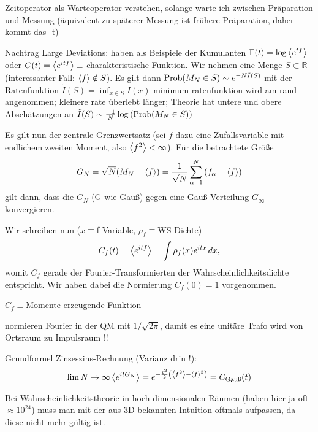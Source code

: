 Zeitoperator als Warteoperator verstehen, solange warte ich zwischen Präparation und Messung (äquivalent zu späterer Messung ist frühere Präparation, daher kommt das -t)



Nachtrag Large Deviations: haben als Beispiele der Kumulanten $\Gamma(t) = \log\expval{e^{tf}}$ oder $C(t) = \expval{e^{itf}} \equiv$ charakteristische Funktion. Wir nehmen eine Menge $S \subset \mathbb{R}$ (interessanter Fall: $\expval{f} \notin S$). Es gilt dann $\text{Prob}\qty(M_N \in S) \sim e^{-N \tilde{I}(S)}$ mit der Ratenfunktion $\tilde{I}(S) = \inf_{x \in S} I(x)$
minimum ratenfunktion wird am rand angenommen; kleinere rate überlebt länger; Theorie hat untere und obere Abschätzungen an $\tilde{I}(S) \sim \frac{-1}{N} \log\qty(\text{Prob}\qty(M_N \in S))$

Es gilt nun der zentrale Grenzwertsatz (sei $f$ dazu eine Zufallsvariable mit endlichem zweiten Moment, also $\expval{f^2} < \infty$). Für die betrachtete Größe
\begin{equation}\label{key}
G_N = \sqrt{N} \qty(M_N - \expval{f}) = \frac{1}{\sqrt{N}} \sum\limits_{\alpha = 1}^N \qty(f_\alpha - \expval{f})
\end{equation}
gilt dann, dass die $G_N$ (G wie Gauß) gegen eine Gauß-Verteilung $G_\infty$ konvergieren.

Wir schreiben nun ($x \equiv$f-Variable, $\rho_f \equiv$WS-Dichte)
\begin{equation}\label{key}
C_f(t) = \expval{e^{itf}} = \int \rho_f(x) e^{itx} \, dx ,
\end{equation}
womit $C_f$ gerade der Fourier-Transformierten der Wahrscheinlichkeitsdichte entspricht. Wir haben dabei die Normierung $C_f(0) = 1$ vorgenommen.

$C_f \equiv$Momente-erzeugende Funktion

normieren Fourier in der QM mit $1/\sqrt{2\pi}$, damit es eine unitäre Trafo wird von Ortsraum zu Impulsraum !!

Grundformel Zinseszins-Rechnung (Varianz drin !):
\begin{equation}\label{key}
\lim{N \rightarrow \infty} \expval{e^{it G_N}} = e^{-\frac{t^2}{2} \qty(\expval{f^2} - \expval{f}^2)} = C_{\text{Gauß}}(t)
\end{equation}

Bei Wahrscheinlichkeitstheorie in hoch dimensionalen Räumen (haben hier ja oft $\approx 10^{24}$) muss man mit der aus 3D bekannten Intuition oftmals aufpassen, da diese nicht mehr gültig ist.

